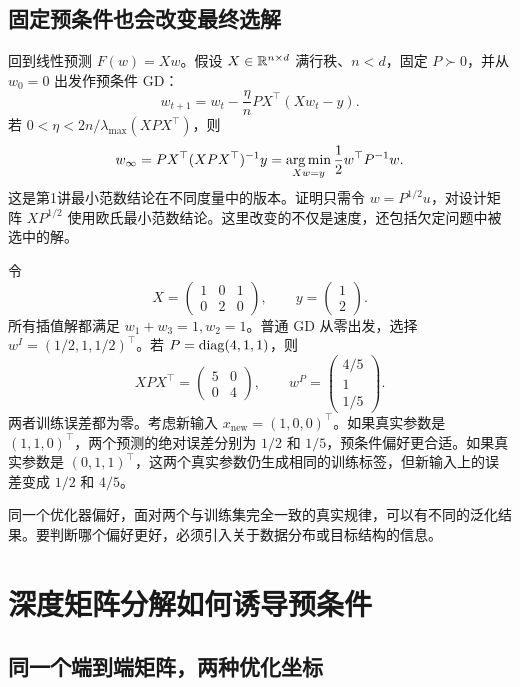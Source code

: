\subsection{固定预条件也会改变最终选解}

回到线性预测 $F(w)=Xw$。假设 $X\in\mathbb R^{n\times d}$ 满行秩、$n<d$，固定 $P\succ0$，并从 $w_0=0$ 出发作预条件 GD：
\[
 w_{t+1}=w_t-\frac\eta nP X^\top(Xw_t-y).
\]
若 $0<\eta<2n/\lambda_{\max}(XPX^\top)$，则
\begin{equation}
 w_\infty=P X^\top(XPX^\top)^{-1}y
 =\operatorname*{arg\,min}_{Xw=y}\frac12w^\top P^{-1}w.
 \label{l5:weighted-min-norm}
\end{equation}
这是第1讲最小范数结论在不同度量中的版本。证明只需令 $w=P^{1/2}u$，对设计矩阵 $XP^{1/2}$ 使用欧氏最小范数结论。这里改变的不仅是速度，还包括欠定问题中被选中的解。

\begin{example}[选解偏好与数据是否匹配]
令
\[
 X=\begin{pmatrix}1&0&1\\0&2&0\end{pmatrix},
 \qquad y=\begin{pmatrix}1\\2\end{pmatrix}.
\]
所有插值解都满足 $w_1+w_3=1,w_2=1$。普通 GD 从零出发，选择
$w^{I}=(1/2,1,1/2)^\top$。若 $P=\operatorname{diag}(4,1,1)$，则
\[
 XPX^\top=\begin{pmatrix}5&0\\0&4\end{pmatrix},
 \qquad
 w^{P}=\begin{pmatrix}4/5\\1\\1/5\end{pmatrix}.
\]
两者训练误差都为零。考虑新输入 $x_{\mathrm{new}}=(1,0,0)^\top$。如果真实参数是 $(1,1,0)^\top$，两个预测的绝对误差分别为 $1/2$ 和 $1/5$，预条件偏好更合适。如果真实参数是 $(0,1,1)^\top$，这两个真实参数仍生成相同的训练标签，但新输入上的误差变成 $1/2$ 和 $4/5$。

同一个优化器偏好，面对两个与训练集完全一致的真实规律，可以有不同的泛化结果。要判断哪个偏好更好，必须引入关于数据分布或目标结构的信息。
\end{example}

\section{深度矩阵分解如何诱导预条件}
\label{l5:factorization}

\subsection{同一个端到端矩阵，两种优化坐标}

